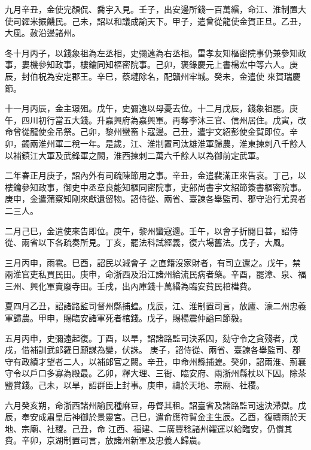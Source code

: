 \begin{pinyinscope}
 九月辛丑，金使完顏侃、喬宇入見。壬子，出安邊所錢一百萬緡，命江、淮制置大使司糴米振饑民。己未，詔以和議成諭天下。甲子，遣曾從龍使金賀正旦。乙丑，大風。赦沿邊諸州。



 冬十月丙子，以錢象祖為左丞相，史彌遠為右丞相。雷孝友知樞密院事仍兼參知政事，婁機參知政事，樓鑰同知樞密院事。己卯，褒錄慶元上書楊宏中等六人。庚辰，封伯柷為安定郡王。辛巳，蔡璉除名，配贛州牢城。癸未，金遣使
 來賀瑞慶節。



 十一月丙辰，金主璟殂。戊午，史彌遠以母憂去位。十二月戊辰，錢象祖罷。庚午，四川初行當五大錢。升嘉興府為嘉興軍。再奪李沐三官、信州居住。戊寅，改命曾從龍使金吊祭。己卯，黎州蠻畜卜寇邊。己丑，遣宇文紹彭使金賀即位。辛卯，蠲兩淮州軍二稅一年。是歲，江、淮制置司汰雄淮軍歸農，淮東揀刺八千餘人以補鎮江大軍及武鋒軍之闕，淮西揀刺二萬六千餘人以為御前定武軍。



 二年春正月庚子，詔內外有司疏陳節用之事。辛丑，金遣裴滿正來告哀。丁己，以樓鑰參知政事，御史中丞章良能知樞同密院事，吏部尚書宇文紹節簽書樞密院事。庚申，金遣蒲察知剛來獻遺留物。詔侍從、兩省、臺諫各舉監司、郡守治行尤異者二三人。



 二月己巳，金遣使來告即位。庚午，黎州蠻寇邊。壬午，以會子折閱日甚，詔侍從、兩省以下各疏奏所見。丁亥，罷法科試經義，復六場舊法。戊子，大風。



 三月丙申，雨雹。巳酉，詔民以減會子
 之直籍沒家財者，有司立還之。戊午，禁兩淮官吏私買民田。庚申，命浙西及沿江諸州給流民病者藥。辛酉，罷漳、泉、福三州、興化軍賣廢寺田。壬戌，出內庫錢十萬緡為臨安貧民棺槥費。



 夏四月乙丑，詔諸路監司督州縣捕蝗。戊辰，江、淮制置司言，放廬、濠二州忠義軍歸農。甲申，賜臨安諸軍死者棺錢。戊子，賜楊震仲謚曰節毅。



 五月丙申，史彌遠起復。丁酉，以旱，詔諸路監司決系囚，劾守令之貪殘者，戊戌，借補訓武郎羅日願謀為變，伏誅。
 庚子，詔侍從、兩省、臺諫各舉監司、郡守有政績才望者二人，以補郎官之闕。辛丑，申命州縣捕蝗。癸卯，詔兩淮、荊襄守令以戶口多寡為殿最。乙卯，釋大理、三衙、臨安府、兩浙州縣杖以下囚。除茶鹽賞錢。己未，以旱，詔群臣上封事。庚申，禱於天地、宗廟、社稷。



 六月癸亥朔，命浙西諸州諭民種麻豆，毋督其租。詔臺省及諸路監司速決滯獄。戊辰，奉安成肅皇后神御於景靈宮。己巳，遣俞應符賀金主生辰。乙酉，復禱雨於天地、宗廟、社稷。己丑，命
 江西、福建、二廣豐稔諸州糴運以給臨安，仍償其費。辛卯，京湖制置司言，放諸州新軍及忠義人歸農。




\end{pinyinscope}
